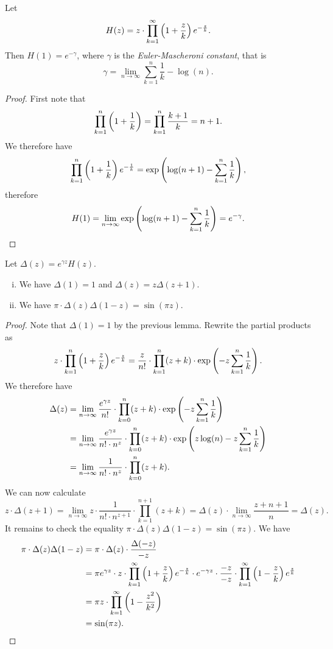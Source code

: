 \begin{lema}
Let
\[
H(z) =
z \cdot \prod_{k=1}^\infty \left(1 + \frac{z}{k}\right) e^{-\frac{z}{k}}.
\]
Then $H(1) = e^{-\gamma}$, where $\gamma$ is the
\emph{Euler-Mascheroni constant},
that is
\[
\gamma = \lim_{n \to \infty} \sum_{k=1}^n \frac{1}{k} - \log(n).
\]
\end{lema}

\begin{proof}
First note that
\[
\prod_{k=1}^n \left(1 + \frac{1}{k}\right) =
\prod_{k=1}^n \frac{k+1}{k} =
n+1.
\]
We therefore have
\[
\prod_{k=1}^n \left(1 + \frac{1}{k}\right) e^{-\frac{1}{k}} =
\exp \left(\log(n+1) - \sum_{k=1}^n \frac{1}{k}\right),
\]
therefore
\[
H(1) =
\lim_{n \to \infty}
\exp \left(\log(n+1) - \sum_{k=1}^n \frac{1}{k}\right) =
e^{-\gamma}. \qedhere
\]
\end{proof}

\begin{lema}
Let $\Delta(z) = e^{\gamma z} H(z)$.

\begin{enumerate}[i)]
\item We have $\Delta(1) = 1$ and $\Delta(z) = z \Delta(z+1)$.
\item We have $\pi \cdot \Delta(z) \Delta(1-z) = \sin(\pi z)$.
\end{enumerate}
\end{lema}

\begin{proof}
Note that $\Delta(1) = 1$ by the previous lemma. Rewrite the
partial products as
\[
z \cdot \prod_{k=1}^n \left(1 + \frac{z}{k}\right) e^{-\frac{z}{k}} =
\frac{z}{n!} \cdot \prod_{k=1}^n (z+k) \cdot
\exp \left(-z \sum_{k=1}^n \frac{1}{k}\right).
\]
We therefore have
\begin{align*}
\Delta(z) &=
\lim_{n \to \infty}
\frac{e^{\gamma z}}{n!} \cdot \prod_{k=0}^n (z+k) \cdot
\exp \left(-z \sum_{k=1}^n \frac{1}{k}\right)
\\
&=
\lim_{n \to \infty}
\frac{e^{\gamma z}}{n! \cdot n^z} \cdot \prod_{k=0}^n (z+k) \cdot
\exp \left(z \log(n) -z \sum_{k=1}^n \frac{1}{k}\right)
\\
&=
\lim_{n \to \infty}
\frac{1}{n! \cdot n^z} \cdot \prod_{k=0}^n (z+k).
\end{align*}
We can now calculate
\[
z \cdot \Delta(z+1) =
\lim_{n \to \infty}
z \cdot \frac{1}{n! \cdot n^{z+1}} \cdot \prod_{k=1}^{n+1} (z+k) =
\Delta(z) \cdot \lim_{n \to \infty} \frac{z + n + 1}{n} =
\Delta(z).
\]
It remains to check the equality
$\pi \cdot \Delta(z) \Delta(1-z) = \sin(\pi z)$. We have
\begin{align*}
\pi \cdot \Delta(z) \Delta(1-z) &=
\pi \cdot \Delta(z) \cdot \frac{\Delta(-z)}{-z}
\\
&=
\pi e^{\gamma z} \cdot z \cdot
\prod_{k=1}^\infty \left(1 + \frac{z}{k}\right) e^{-\frac{z}{k}} \cdot
e^{-\gamma z} \cdot \frac{-z}{-z} \cdot
\prod_{k=1}^\infty \left(1 - \frac{z}{k}\right) e^{\frac{z}{k}}
\\
&=
\pi z \cdot \prod_{k=1}^\infty \left(1 - \frac{z^2}{k^2}\right)
\\
&=
\sin(\pi z). \qedhere
\end{align*}
\end{proof}

